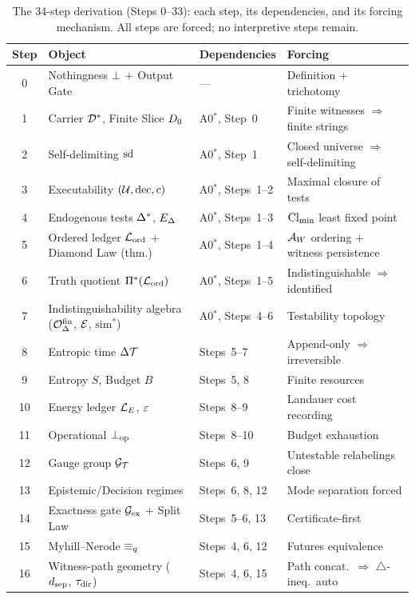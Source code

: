 \begin{table}[ht]
\centering\small
\caption{The 34-step derivation (Steps 0--33): each step, its dependencies,
and its forcing mechanism.  All steps are forced; no interpretive steps remain.}
\label{tab:derivation-summary}
\begin{tabular}{@{}cllp{4.5cm}@{}}
\toprule
\textbf{Step} & \textbf{Object} & \textbf{Dependencies} & \textbf{Forcing} \\
\midrule
0  & Nothingness $\bot$ + Output Gate & --- & Definition + trichotomy \\
1  & Carrier $\mathcal{D}^*$, Finite Slice $D_0$ & A0$^*$, Step~0 & Finite witnesses $\Rightarrow$ finite strings \\
2  & Self-delimiting $\mathrm{sd}$ & A0$^*$, Step~1 & Closed universe $\Rightarrow$ self-delimiting \\
\midrule
3  & Executability $(\mathcal{U}, \mathrm{dec}, c)$ & A0$^*$, Steps~1--2 & Maximal closure of tests \\
4  & Endogenous tests $\Delta^*$, $E_\Delta$ & A0$^*$, Steps~1--3 & $\mathrm{Cl}_{\min}$ least fixed point \\
\midrule
5  & Ordered ledger $\mathcal{L}_{\mathrm{ord}}$ + Diamond Law (thm.) & A0$^*$, Steps~1--4 & $\mathcal{A}_W$ ordering + witness persistence \\
6  & Truth quotient $\Pi^*(\mathcal{L}_{\mathrm{ord}})$ & A0$^*$, Steps~1--5 & Indistinguishable $\Rightarrow$ identified \\
7  & Indistinguishability algebra ($\mathcal{O}^{\mathrm{fin}}_\Delta$, $\mathcal{E}$, $\mathrm{sim}^*$) & A0$^*$, Steps~4--6 & Testability topology \\
\midrule
8  & Entropic time $\Delta\mathcal{T}$ & Steps~5--7 & Append-only $\Rightarrow$ irreversible \\
9  & Entropy $S$, Budget $B$ & Steps~5, 8 & Finite resources \\
10 & Energy ledger $\mathcal{L}_E$, $\varepsilon$ & Steps~8--9 & Landauer cost recording \\
11 & Operational $\bot_{\mathrm{op}}$ & Steps~8--10 & Budget exhaustion \\
\midrule
12 & Gauge group $\mathcal{G}_{\mathcal{T}}$ & Steps~6, 9 & Untestable relabelings close \\
13 & Epistemic/Decision regimes & Steps~6, 8, 12 & Mode separation forced \\
14 & Exactness gate $\mathcal{G}_{\mathrm{ex}}$ + Split Law & Steps~5--6, 13 & Certificate-first \\
15 & Myhill--Nerode $\equiv_q$ & Steps~4, 6, 12 & Futures equivalence \\
16 & Witness-path geometry ($d_{\mathrm{sep}}$, $\tau_{\mathrm{dir}}$) & Steps~4, 6, 15 & Path concat.\ $\Rightarrow$ $\triangle$-ineq.\ auto \\

\end{tabular}
\end{table}
